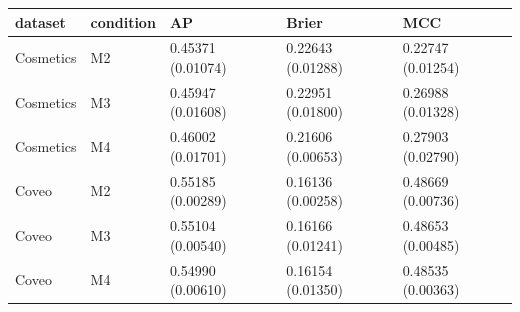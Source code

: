 \begin{tabular}{lllll}
\toprule
dataset & condition & AP & Brier & MCC \\
\midrule
Cosmetics & M2 & 0.45371 (0.01074) & 0.22643 (0.01288) & 0.22747 (0.01254) \\
Cosmetics & M3 & 0.45947 (0.01608) & 0.22951 (0.01800) & 0.26988 (0.01328) \\
Cosmetics & M4 & 0.46002 (0.01701) & 0.21606 (0.00653) & 0.27903 (0.02790) \\
Coveo & M2 & 0.55185 (0.00289) & 0.16136 (0.00258) & 0.48669 (0.00736) \\
Coveo & M3 & 0.55104 (0.00540) & 0.16166 (0.01241) & 0.48653 (0.00485) \\
Coveo & M4 & 0.54990 (0.00610) & 0.16154 (0.01350) & 0.48535 (0.00363) \\
\bottomrule
\end{tabular}
